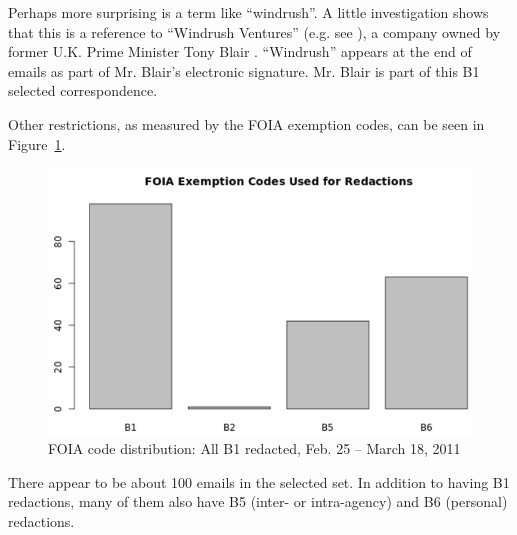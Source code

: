 \documentclass[journal]{vgtc}                %
\begin{document}
Perhaps more surprising is a term like ``windrush''.  A little investigation shows that this is a reference to ``Windrush Ventures'' (e.g. see  \cite{windrushTelegraph, windrushGuardian}),  a company owned by former U.K. Prime Minister Tony Blair .  ``Windrush'' appears at the end of emails as part of Mr. Blair's electronic signature.   Mr. Blair is part of this B1 selected correspondence.

Other restrictions, as measured by the FOIA exemption codes, can be seen in Figure~\ref{fig:FOIAB12011LibyaBuildup}.
\begin{figure}[h]
\begin{center}
\includegraphics[width=0.95\linewidth]{FOIAB12011LibyaBuildup}
\caption{FOIA code distribution: All  B1 redacted, Feb. 25 -- March 18, 2011}
\label{fig:FOIAB12011LibyaBuildup}
\end{center}
\end{figure}
There appear to be about 100 emails in the selected set.  In addition to having B1 redactions, many of them also have B5 (inter- or intra-agency) and B6 (personal) redactions.
\end{document}
